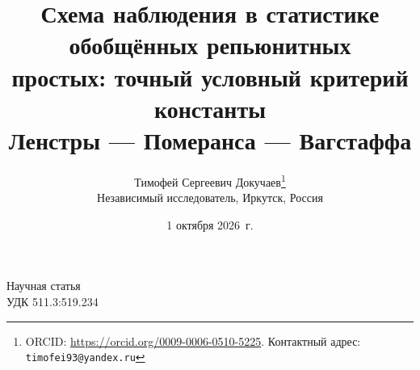 \documentclass[11pt,a4paper]{article}
\title{Схема наблюдения в статистике обобщённых репьюнитных\\
простых: точный условный критерий константы\\
Ленстры --- Померанса --- Вагстаффа}
\author{Тимофей Сергеевич Докучаев\thanks{ORCID: \url{https://orcid.org/0009-0006-0510-5225}.
Контактный адрес: \texttt{timofei93@yandex.ru}}\\
\small Независимый исследователь, Иркутск, Россия}
\date{1 октября 2026~г.}
\theoremstyle{plain}
\theoremstyle{remark}
\begin{document}
\noindent Научная статья\\
\noindent УДК 511.3:519.234
\medskip

\let\RHnewpage\newpage
\let\newpage\relax
\maketitle
\let\newpage\RHnewpage
\end{document}
